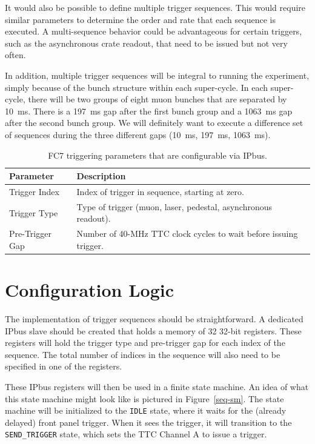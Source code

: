 \newpage

It would also be possible to define multiple trigger sequences.  This would require similar parameters to determine the order and rate that each sequence is executed.  A multi-sequence behavior could be advantageous for certain triggers, such as the asynchronous crate readout, that need to be issued but not very often.

In addition, multiple trigger sequences will be integral to running the  experiment, simply because of the bunch structure within each super-cycle.  In each super-cycle, there will be two groups of eight muon bunches that are separated by 10~ms.  There is a 197~ms gap after the first bunch group and a 1063~ms gap after the second bunch group.  We will definitely want to execute a difference set of sequences during the three different gaps (10~ms, 197~ms, 1063~ms).

{
\renewcommand{\arraystretch}{1.25}
\begin{table}[t]
\centering
\begin{tabular}{| l | l |}
\hline
Parameter                	& Description \\ \hline \hline
Trigger Index  		& Index of trigger in sequence, starting at zero. \\
Trigger Type  		& Type of trigger (muon, laser, pedestal, asynchronous readout). \\ 
Pre-Trigger Gap   	& Number of 40-MHz TTC clock cycles to wait before issuing trigger. \\
\hline
\end{tabular}
\caption{FC7 triggering parameters that are configurable via IPbus.}
\label{fc7-param}
\end{table}
}

\section{Configuration Logic}

The implementation of trigger sequences should be straightforward.  A dedicated IPbus slave should be created that holds a memory of 32 32-bit registers.  These registers will hold the trigger type and pre-trigger gap for each index of the sequence.  The total number of indices in the sequence will also need to be specified in one of the registers.

These IPbus registers will then be used in a finite state machine.  An idea of what this state machine might look like is pictured in Figure~\ref{seq-sm}.  The state machine will be initialized to the \verb|IDLE| state, where it waits for the (already delayed) front panel trigger.  When it sees the trigger, it will transition to the \verb|SEND_TRIGGER| state, which sets the TTC Channel A to issue a trigger.

